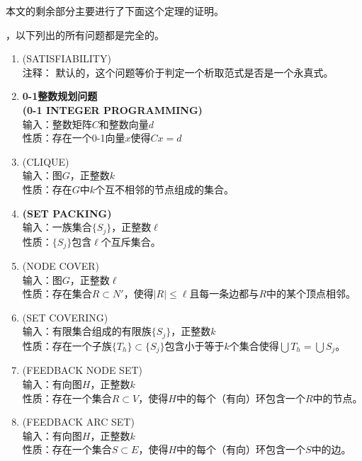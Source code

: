 \documentclass[twocolumn]{article}
\theoremstyle{nonumberplain}%
\begin{document}
\begin{CJK}{UTF8}{gbsn}
    本文的剩余部分主要进行了下面这个定理的证明。
    
    {}，以下列出的所有问题都是完全的。

    \begin{enumerate}
    \item {(SATISFIABILITY)}\\
    注释： 默认的，这个问题等价于判定一个析取范式是否是一个永真式。

    \item {\bf0-1整数规划问题\\(0-1 INTEGER PROGRAMMING)}\\
    输入：整数矩阵$C$和整数向量$d$\\
    性质：存在一个0-1向量$x$使得$Cx=d$

    \item {(CLIQUE)}\\
    输入：图$G$，正整数$k$\\
    性质：存在$G$中$k$个互不相邻的节点组成的集合。

    \item {\bf(SET PACKING)}\\
    输入：一族集合$\{S_j\}$，正整数$\ell$\\
    性质：$\{S_j\}$包含$\ell$个互斥集合。

    \item {(NODE COVER)}\\
    输入：图$G$，正整数$\ell$\\
    性质：存在集合$R\subset N'$，使得$|R|\leq\ell$且每一条边都与$R$中的某个顶点相邻。

    \item {(SET COVERING)}\\
    输入：有限集合组成的有限族$\{S_j\}$，正整数$k$\\
    性质：存在一个子族$\{T_h\}\subset\{S_j\}$包含小于等于$k$个集合使得$\bigcup T_h=\bigcup S_j$。

    \item {(FEEDBACK NODE SET)}\\
    输入：有向图$H$，正整数$k$\\
    性质：存在一个集合$R\subset V$，使得$H$中的每个（有向）环包含一个$R$中的节点。

    \item {(FEEDBACK ARC SET)}\\
    输入：有向图$H$，正整数$k$\\
    性质：存在一个集合$S\subset E$，使得$H$中的每个（有向）环包含一个$S$中的边。


\end{enumerate}
\end{CJK}
\end{document}
